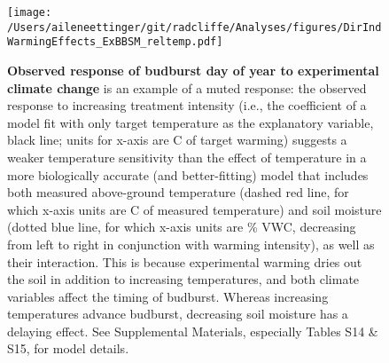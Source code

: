 \documentclass{article}
\begin{document}
\begin{figure}[h]
\centering
 \texttt{[image: /Users/aileneettinger/git/radcliffe/Analyses/figures/DirIndWarmingEffects\_ExBBSM\_reltemp.pdf]} 
 \caption{\textbf{Observed response of budburst day of year to experimental climate change} is an example of a muted response: the observed response to increasing treatment intensity (i.e., the coefficient of a model fit with only target temperature as the explanatory variable, black line; units for x-axis are \degree C of target warming) suggests a weaker temperature sensitivity than the effect of temperature in a more biologically accurate (and better-fitting) model that includes both measured above-ground temperature (dashed red line, for which x-axis units are \degree C of measured temperature)  and soil moisture (dotted blue line, for which x-axis units are \% VWC, decreasing from left to right in conjunction with warming intensity), as well as their interaction. This is because experimental warming dries out the soil in addition to increasing temperatures, and both climate variables affect the timing of budburst. Whereas increasing temperatures advance budburst, decreasing soil moisture has a delaying effect. See Supplemental Materials, especially Tables S14 \& S15, for model details.} 
 
\label{fig:phen}
\end{figure}
  

\end{document}
